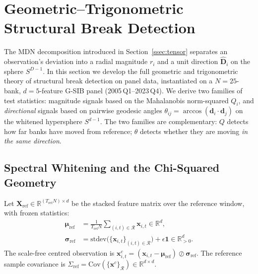 \documentclass[journal]{IEEEtran}
\newcommand{\R}{\mathbb{R}}
\begin{document}
\section{Geometric--Trigonometric Structural Break Detection}
\label{sec:geo_trig}

The MDN decomposition introduced in Section~\ref{ssec:tensor} separates an
observation's deviation into a radial magnitude $r_i$ and a unit direction
$\hat{\mathbf{D}}_i$ on the sphere $S^{D-1}$.  In this section we develop
the full geometric and trigonometric theory of structural break detection
on panel data, instantiated on a $N{=}25$-bank, $d{=}5$-feature G-SIB
panel (2005\,Q1--2023\,Q4).  We derive two families of test statistics:
magnitude signals based on the Mahalanobis norm-squared $Q_i$, and
\emph{directional} signals based on pairwise geodesic angles
$\theta_{ij} = \arccos(\mathbf{d}_i \cdot \mathbf{d}_j)$ on the whitened
hypersphere $S^{d-1}$.  The two families are complementary: $Q$ detects
how far banks have moved from reference; $\theta$ detects whether they are
moving \emph{in the same direction}.

\subsection{Spectral Whitening and the Chi-Squared Geometry}
\label{ssec:whitening}

Let $\mathbf{X}_{\mathrm{ref}} \in \R^{(T_{\mathrm{ref}} N) \times d}$ be the
stacked feature matrix over the reference window, with frozen statistics:
\begin{align}
  \boldsymbol{\mu}_{\mathrm{ref}} &= \tfrac{1}{T_{\mathrm{ref}}N}
    \sum_{(i,t)\in\mathcal{R}} \mathbf{x}_{i,t} \in \R^d, \label{eq:mu_ref}\\
  \boldsymbol{\sigma}_{\mathrm{ref}} &= \mathrm{stdev}\bigl(\{\mathbf{x}_{i,t}\}_{(i,t)\in\mathcal{R}}\bigr)
    + \epsilon\mathbf{1} \in \R^d_{>0}. \label{eq:sig_ref}
\end{align}
The scale-free centred observation is
$\mathbf{x}^c_{i,t} = (\mathbf{x}_{i,t} - \boldsymbol{\mu}_{\mathrm{ref}})
  \oslash \boldsymbol{\sigma}_{\mathrm{ref}}$.
The reference sample covariance is
$\Sigma_{\mathrm{ref}} = \mathrm{Cov}(\{\mathbf{x}^c\}_{\mathcal{R}}) \in \R^{d\times d}$.
\end{document}
